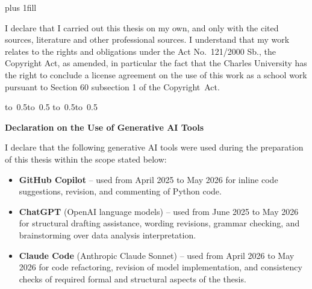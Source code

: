 \newpage


\openright
\hypersetup{pageanchor=true}
\vglue 0pt plus 1fill

\noindent
I declare that I carried out this \ThesisTypeName{} thesis on my own, and only with the cited
sources, literature and other professional sources.
I understand that my work relates to the rights and obligations under the Act No.~121/2000 Sb.,
the Copyright Act, as amended, in particular the fact that the Charles
University has the right to conclude a license agreement on the use of this
work as a school work pursuant to Section 60 subsection 1 of the Copyright~Act.

\vspace{10mm}

\hbox{\hbox to 0.5\hbox to 0.5\hsize{\dotfill\quad}}
\smallskip
\hbox{\hbox to 0.5\hsize{}\hbox to 0.5}

\vspace{20mm}
\newpage


\openright

\noindent
{\large\bfseries Declaration on the Use of Generative AI Tools}

\vspace{5mm}

\noindent
I declare that the following generative AI tools were used during the preparation of this \ThesisTypeName{} thesis within the scope stated below:

\begin{itemize}
    \item \textbf{GitHub Copilot} -- used from April 2025 to May 2026 for inline code suggestions, revision, and commenting of Python code.

    \item \textbf{ChatGPT} (OpenAI language models) -- used from June 2025 to May 2026 for structural drafting assistance, wording revisions, grammar checking, and brainstorming over data analysis interpretation.

    \item \textbf{Claude Code} (Anthropic Claude Sonnet) -- used from April 2026 to May 2026 for code refactoring, revision of model implementation, and consistency checks of required formal and structural aspects of the thesis.
\end{itemize}

